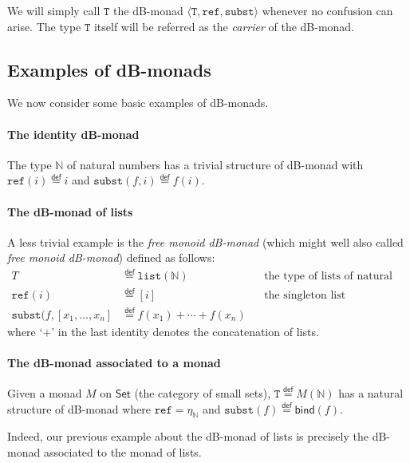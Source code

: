\documentclass[a4paper,twoside,12pt]{article}
\theoremstyle{definition}
\theoremstyle{remark}
\newcommand{\NN}{\mathbb{N}}
\newcommand{\subst}{\mathtt{subst}}
\newcommand{\refe}{\mathtt{ref}}
\newcommand{\TT}{\mathtt{T}}
\begin{document}
We will simply call $\TT$ the dB-monad
$\langle \TT, \refe, \subst \rangle$ whenever no confusion can arise.
The type $\TT$ itself will be referred as the \emph{carrier} of the
dB-monad.

\subsection{Examples of dB-monads}
\label{sec:examples-dB-monads}

We now consider some basic examples of dB-monads.

\paragraph{The identity dB-monad}

The type $\NN$ of natural numbers has a trivial structure of dB-monad
with $\refe(i) \stackrel{\mathsf{def}}{=} i$ and
$\subst(f,i) \stackrel{\mathsf{def}}{=} f(i)$.

\paragraph{The dB-monad of lists}

A less trivial example is the \emph{free monoid dB-monad} (which might
well also called \emph{free monoid dB-monad}) defined as follows:
\begin{align*}
T &\stackrel{\mathsf{def}}{=}\mathtt{list}(\NN) && \text{the type of lists of natural numbers} \\
\refe(i) &\stackrel{\mathsf{def}}{=} [i] &&\text{the singleton list} \\
\subst(f,[x_1, \dots, x_n] &\stackrel{\mathsf{def}}{=} f(x_1) + \cdots + f(x_n)
\end{align*}
where `$+$' in the last identity denotes the concatenation of lists.

\paragraph{The dB-monad associated to a monad}

Given a monad $M$ on $\mathsf{Set}$ (the category of small sets),
$\TT \stackrel{\mathsf{def}}{=} M(\NN)$ has a natural structure of
dB-monad where $\refe = \eta_\NN$ and
$\subst(f) \stackrel{\mathsf{def}}{=} \mathsf{bind}(f)$.

Indeed, our previous example about the dB-monad of lists is precisely
the dB-monad associated to the monad of lists.
\end{document}
